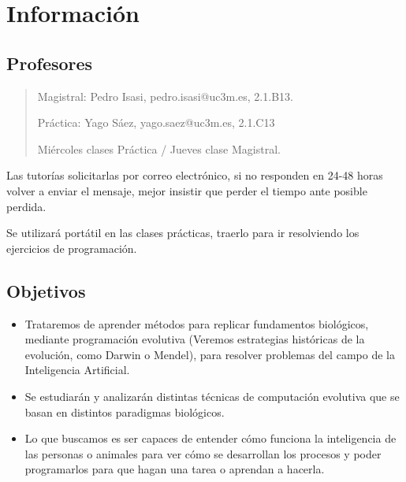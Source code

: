 \documentclass[12pt, twoside, openright]{report} %
\begin{document}
\listoffigures
\thispagestyle{fancy}

\listoftables
\thispagestyle{fancy}





\chapter{Información}

\section{Profesores}
\begin{quote}
	Magistral: Pedro Isasi, pedro.isasi@uc3m.es, 2.1.B13.

	Práctica: Yago Sáez, yago.saez@uc3m.es, 2.1.C13

	Miércoles clases Práctica / Jueves clase Magistral.
\end{quote}

Las tutorías solicitarlas por correo electrónico, si no responden en 24-48 horas volver a enviar el mensaje, mejor insistir que perder el tiempo ante posible perdida.

Se utilizará portátil en las clases prácticas, traerlo para ir resolviendo los ejercicios de programación.

\section{Objetivos}
\begin{itemize}
	\item Trataremos de aprender métodos para replicar fundamentos biológicos, mediante programación evolutiva (Veremos estrategias históricas de la evolución, como Darwin o Mendel), para resolver problemas del campo de la Inteligencia Artificial.
	\item Se estudiarán y analizarán distintas técnicas de computación evolutiva que se basan en distintos paradigmas biológicos.
	\item Lo que buscamos es ser capaces de entender cómo funciona la inteligencia de las personas o animales para ver cómo se desarrollan los procesos y poder programarlos para que hagan una tarea o aprendan a hacerla.
\end{itemize}
\end{document}
